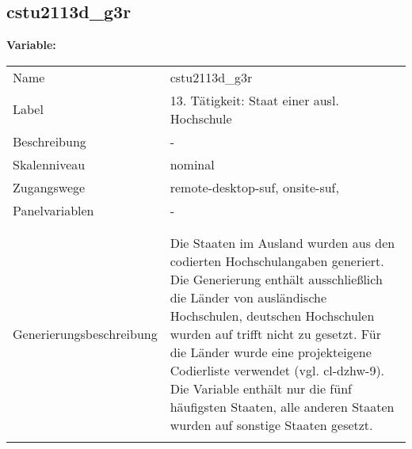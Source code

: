 	
	
	\subsection{cstu2113d\_g3r}
	\label{subSection:cstu2113d_g3r}

	\noindent\textbf{Variable:}\\
		\begin{tabular}{lL{11.3cm}}
			\label{tableVariable:cstu2113d_g3r}
			Name & cstu2113d\_g3r \\
			Label & 13. Tätigkeit: Staat einer ausl. Hochschule \\
			Beschreibung & - \\
			Skalenniveau & nominal \\
			Zugangswege &
				remote-desktop-suf,
				onsite-suf,
 \\
			Panelvariablen & -
			 \\
			 \\
 \\
					Generierungsbeschreibung & Die Staaten im Ausland wurden aus den codierten Hochschulangaben generiert. Die Generierung enthält ausschließlich die Länder von ausländische Hochschulen, deutschen Hochschulen wurden auf trifft nicht zu gesetzt. Für die Länder wurde eine projekteigene Codierliste verwendet (vgl. cl-dzhw-9). Die Variable enthält nur die fünf häufigsten Staaten, alle anderen Staaten wurden auf sonstige Staaten gesetzt. 
				 \\	
			 \\
		\end{tabular}






